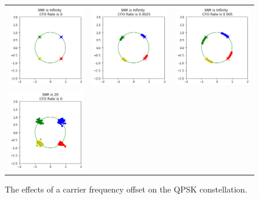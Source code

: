 \setlength{\tabcolsep}{0pt}
\begin{figure}
  \centering
  \label{fig:single_tap_cfo}\caption{The effects of a carrier frequency offset on the QPSK constellation.}
  \begin{tabular}{ccc}
    \includegraphics[width=50mm]{figures/cfo_intro/snr_0/cfo_0.png}&
    \includegraphics[width=50mm]{figures/cfo_intro/snr_0/cfo_1.png}&
    \includegraphics[width=50mm]{figures/cfo_intro/snr_0/cfo_2.png}\\
    \includegraphics[width=50mm]{figures/cfo_intro/snr_20/cfo_0.png}&

\end{tabular}
\end{figure}
